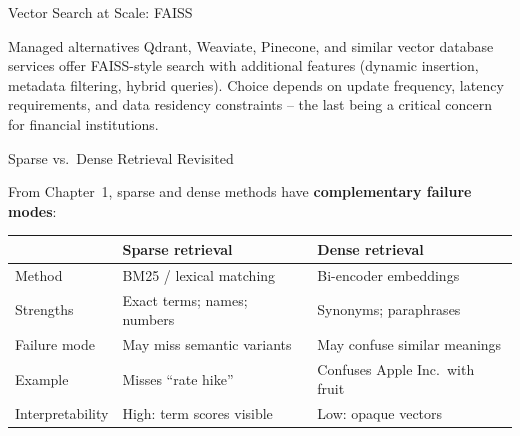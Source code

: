 \documentclass[11pt,aspectratio=169,professionalfonts]{beamer}
\begin{document}
%
%
\begin{frame}{Vector Search at Scale: FAISS}
  \begin{block}{Managed alternatives}
    Qdrant, Weaviate, Pinecone, and similar vector database services
    offer FAISS-style search with additional features (dynamic insertion,
    metadata filtering, hybrid queries).
    Choice depends on update frequency, latency requirements, and
    data residency constraints -- the last being a critical concern for
    financial institutions.
  \end{block}
\end{frame}
%
%
\begin{frame}{Sparse vs.\ Dense Retrieval Revisited}

  From Chapter~1, sparse and dense methods have
  \textbf{complementary failure modes}:
  \medskip

  \begin{center}
  \renewcommand{\arraystretch}{1.3}
  \setlength{\tabcolsep}{4pt}

  \begin{tabular}{@{}lll@{}}
    \toprule
      & \textbf{Sparse retrieval}
      & \textbf{Dense retrieval} \\
    \midrule

    Method
      & BM25 / lexical matching
      & Bi-encoder embeddings \\

    Strengths
      & Exact terms; names; numbers
      & Synonyms; paraphrases \\

    Failure mode
      & May miss semantic variants
      & May confuse similar meanings \\

    Example
      & Misses ``rate hike''
      & Confuses Apple Inc.\ with fruit \\

    Interpretability
      & High: term scores visible
      & Low: opaque vectors \\

    \bottomrule
  \end{tabular}

  \end{center}
\end{frame}
%
%
\end{document}
